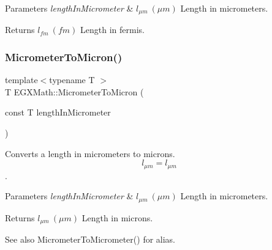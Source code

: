 \begin{DoxyParams}{Parameters}
{\em length\+In\+Micrometer} & $ l_{\mu m}\ (\mu m)$ Length in micrometers. \\
\hline
\end{DoxyParams}
\begin{DoxyReturn}{Returns}
$ l_{fm}\ (fm)$ Length in fermis. 
\end{DoxyReturn}
\mbox{\label{group___e_g_x_math-_conversions-_length_conversions-_s_i-_micrometer-_non-_s_i_ga5dc2a5dba0313f6a71db082aff501329}} 
\subsubsection{\texorpdfstring{Micrometer\+To\+Micron()}{MicrometerToMicron()}}
{\footnotesize\ttfamily template$<$typename T $>$ \\
T E\+G\+X\+Math\+::\+Micrometer\+To\+Micron (\begin{DoxyParamCaption}\item[{const T}]{length\+In\+Micrometer }\end{DoxyParamCaption})}



Converts a length in micrometers to microns. \[ l_{\mu m}=l_{\mu m} \]. 


\begin{DoxyParams}{Parameters}
{\em length\+In\+Micrometer} & $ l_{\mu m}\ (\mu m)$ Length in micrometers. \\
\hline
\end{DoxyParams}
\begin{DoxyReturn}{Returns}
$ l_{\mu m}\ (\mu m)$ Length in microns. 
\end{DoxyReturn}
\begin{DoxySeeAlso}{See also}
Micrometer\+To\+Micrometer() for alias. 
\end{DoxySeeAlso}
\mbox{\label{group___e_g_x_math-_conversions-_length_conversions-_s_i-_micrometer-_non-_s_i_ga2ed475ce56e23d7783d6925f5b409f44}} 
